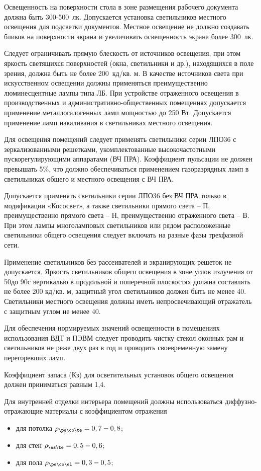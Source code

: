 Освещенность на поверхности стола в зоне размещения рабочего документа должна быть 300-500~лк. Допускается установка светильников местного освещения для подсветки документов. Местное освещение не должно создавать бликов на поверхности экрана и увеличивать освещенность экрана более 300~лк. 

Следует ограничивать прямую блескость от источников освещения, при этом яркость светящихся поверхностей (окна, светильники и др.), находящихся в поле зрения, должна быть не более 200~кд/кв. м. В качестве источников света при искусственном освещении должны применяться преимущественно люминесцентные лампы типа ЛБ. При устройстве отраженного освещения в производственных и административно-общественных помещениях допускается применение металлогалогенных ламп мощностью до 250 Вт. Допускается применение ламп накаливания в светильниках местного освещения. 

Для освещения помещений следует применять светильники серии ЛПО36 с зеркализованными решетками, укомплектованные высокочастотными пускорегулирующими аппаратами (ВЧ ПРА). Коэффициент пульсации не должен превышать 5\%, что должно обеспечиваться применением газоразрядных ламп в светильниках общего и местного освещения с ВЧ ПРА. 

Допускается применять светильники серии ЛПО36 без ВЧ ПРА только в модификации «Кососвет», а также светильники прямого света -- П, преимущественно прямого света -- Н, преимущественно отраженного света -- В. При этом лампы многоламповых светильников или рядом расположенные светильники общего освещения следует включать на разные фазы трехфазной сети.

Применение светильников без рассеивателей и экранирующих решеток не допускается. Яркость светильников общего освещения в зоне углов излучения от 50\textdegree до 90\textdegree с вертикалью в продольной и поперечной плоскостях должна составлять не более 200 кд/кв. м, защитный угол светильников должен быть не менее 40\textdegree. Светильники местного освещения должны иметь непросвечивающий отражатель с защитным углом не менее 40\textdegree.

Для обеспечения нормируемых значений освещенности в помещениях использования ВДТ и ПЭВМ следует проводить чистку стекол оконных рам и светильников не реже двух раз в год и проводить своевременную замену перегоревших ламп.

Коэффициент запаса (Кз) для осветительных установок общего освещения должен приниматься равным 1,4. 

Для внутренней отделки интерьера помещений должны использоваться диффузно-отражающие материалы с коэффициентом отражения 
\begin{itemize}
	\item для потолка $\rho_{\pe\co\te} = 0,7-0,8$;
	\item для стен $\rho_{\es\te} = 0,5-0,6$;
	\item для пола $\rho_{\pe\co\el} = 0,3-0,5$;
\end{itemize}

